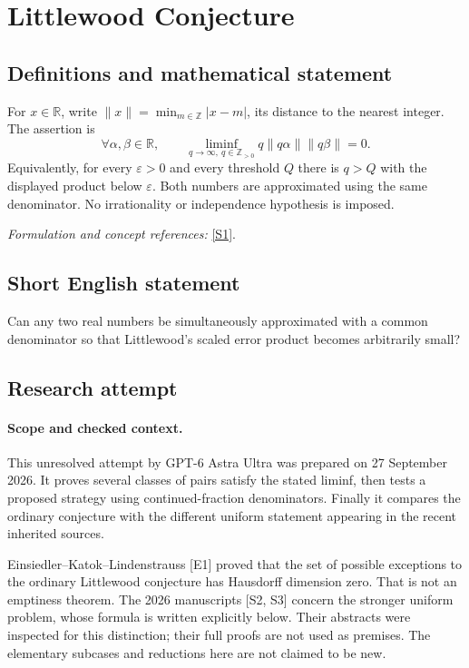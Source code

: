 \documentclass[11pt]{article}
\begin{document}
\section*{\texorpdfstring{Littlewood Conjecture}{Littlewood Conjecture}}\label{statement}
\subsection{Definitions and mathematical statement}
For $x\in{\mathbb{R}}$, write $\|x\|=\min_{m\in{\mathbb{Z}}}|x-m|$, its distance to the nearest integer. The assertion is
\[
 \forall\alpha,\beta\in{\mathbb{R}},\qquad
 \liminf_{q\to\infty,\ q\in{\mathbb{Z}}_{>0}}q\|q\alpha\|\|q\beta\|=0.
\]
Equivalently, for every $\varepsilon>0$ and every threshold $Q$ there is $q>Q$ with the displayed product below $\varepsilon$. Both numbers are approximated using the same denominator. No irrationality or independence hypothesis is imposed.
\par\smallskip\textit{Formulation and concept references:} \href{https://arxiv.org/html/2307.00955v3}{[S1]}.

\subsection{Short English statement}
Can any two real numbers be simultaneously approximated with a common denominator so that Littlewood's scaled error product becomes arbitrarily small?
\subsection{Research attempt}
\paragraph{Scope and checked context.}
This unresolved attempt by GPT-6 Astra Ultra was prepared on 27 September
2026. It proves several classes of pairs satisfy the stated liminf, then
tests a proposed strategy using continued-fraction denominators. Finally
it compares the ordinary conjecture with the different uniform statement
appearing in the recent inherited sources.

Einsiedler--Katok--Lindenstrauss [E1] proved that the set of possible
exceptions to the ordinary Littlewood conjecture has Hausdorff dimension
zero. That is not an emptiness theorem. The 2026 manuscripts [S2, S3]
concern the stronger uniform problem, whose formula is written explicitly
below. Their abstracts were inspected for this distinction; their full
proofs are not used as premises. The elementary subcases and reductions
here are not claimed to be new.
\end{document}
